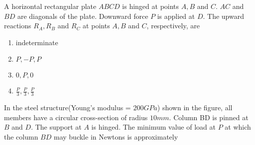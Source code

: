 \iffalse
\chapter{2013}
\author{AI24BTECH11020}
\section{ae}
\fi


\item A horizontal rectangular plate $ABCD$ is hinged at points $A, B$ and $C$. $AC$ and $BD$ are diagonals of the plate. Downward force $P$ is applied at $D$. The upward reactions $R_A,R_B$ and $R_C$ at points $A, B$ and $C$, respectively, are
	\begin{enumerate}
		\item indeterminate
		\item $P,-P,P$
		\item $0,P,0$
		\item $\frac{P}{3},\frac{P}{3},\frac{P}{3}$
	\end{enumerate}
\item In the steel structure(Young's modulus = $200 GPa$) shown in the figure, all members have a circular cross-section of radius $10 mm$. Column BD is pinned at $B$ and $D$. The support at $A$ is hinged. The minimum value of load at $P$ at which the column $BD$ may buckle in Newtons is approximately \underline{\hspace{2cm}} \\
	\begin{center}\end{center}
